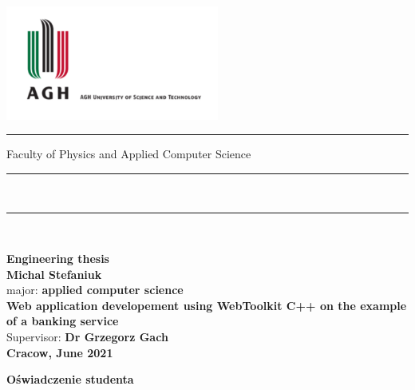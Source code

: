\documentclass[a4paper,12pt]{book}
\begin{document}
\thispagestyle{empty}
\includegraphics[height=37.5mm]{agh_nzw_a_en_1w_wbr_pms}\\
\rule{30mm}{0pt}{
{\large \textsf{Faculty of Physics and Applied Computer Science}}\\
\rule{\textwidth}{3pt}\\
\rule[2ex]
{\textwidth}{1pt}\\
\vspace{7ex}
\begin{center}
{\LARGE \bf \textsf{Engineering thesis}}\\
\vspace{13ex}
{\bf \Large \textsf{Michal Stefaniuk}}\\
\vspace{3ex}
{\small \sf major: {\bf \textsf{applied computer science}}}\\
\vspace{1.5ex}
\vspace{10ex}
{\bf \huge \textsf{Web application developement using WebToolkit
C++ on the example of a banking service}}\\
\vspace{14ex}
{\Large \sf Supervisor: {\bf \textsf{Dr Grzegorz Gach}}}\\
\vspace{22ex}
{\large \bf \textsf{Cracow, June 2021}}
\end{center}

\newpage

\begin{center}
	{\bf\large\textsf{Oświadczenie studenta}}\\
\end{center}

}
\end{document}
